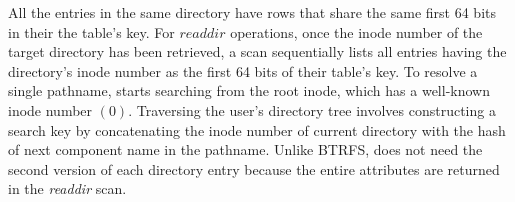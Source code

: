 All the entries in the same directory have rows that 
share the same first 64 bits in their the table's key.
For $readdir$ operations, once the inode number
of the target directory has been retrieved, 
a scan sequentially lists all entries having 
the directory's inode number as the first 64 bits of their table's key. 
To resolve a single pathname, \tfs starts searching from the root inode, 
which has a well-known inode number $(0)$.
Traversing the user's directory tree
involves constructing a search key by concatenating the inode 
number of current directory with the hash of
next component name in the pathname.
Unlike BTRFS, \tfs does not need the second version of each directory entry
because the entire attributes are returned in the \textit{readdir} scan.



